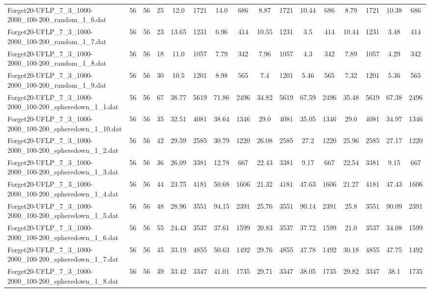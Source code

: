 \begin{sidewaystable}[!ht]
{\begin{tabular}{lccccccccccccccc}
Forget20-UFLP\_7\_3\_1000-2000\_100-200\_random\_1\_6.dat & 56 & 56 & 25 & 12.0 & 1721 & 14.0 & 686 & 8.87 & 1721 & 10.44 & 686 & 8.79 & 1721 & 10.38 & 686 \\
Forget20-UFLP\_7\_3\_1000-2000\_100-200\_random\_1\_7.dat & 56 & 56 & 23 & 13.65 & 1231 & 6.96 & 414 & 10.55 & 1231 & 3.5 & 414 & 10.44 & 1231 & 3.48 & 414 \\
Forget20-UFLP\_7\_3\_1000-2000\_100-200\_random\_1\_8.dat & 56 & 56 & 18 & 11.0 & 1057 & 7.79 & 342 & 7.96 & 1057 & 4.3 & 342 & 7.89 & 1057 & 4.29 & 342 \\
Forget20-UFLP\_7\_3\_1000-2000\_100-200\_random\_1\_9.dat & 56 & 56 & 30 & 10.5 & 1201 & 8.98 & 565 & 7.4 & 1201 & 5.46 & 565 & 7.32 & 1201 &  \textcolor{blue2}{5.36} & 565 \\
Forget20-UFLP\_7\_3\_1000-2000\_100-200\_spheredown\_1\_1.dat & 56 & 56 & 67 & 38.77 & 5619 & 71.86 & 2496 & 34.82 & 5619 & 67.59 & 2496 & 35.48 & 5619 & 67.38 & 2496 \\
Forget20-UFLP\_7\_3\_1000-2000\_100-200\_spheredown\_1\_10.dat & 56 & 56 & 35 & 32.51 & 4081 & 38.64 & 1346 & 29.0 & 4081 & 35.05 & 1346 & 29.0 & 4081 & 34.97 & 1346 \\
Forget20-UFLP\_7\_3\_1000-2000\_100-200\_spheredown\_1\_2.dat & 56 & 56 & 42 & 29.59 & 2585 & 30.79 & 1220 & 26.08 & 2585 & 27.2 & 1220 &  \textcolor{blue2}{25.96} & 2585 & 27.17 & 1220 \\
Forget20-UFLP\_7\_3\_1000-2000\_100-200\_spheredown\_1\_3.dat & 56 & 56 & 36 & 26.09 & 3381 & 12.78 & 667 & 22.43 & 3381 & 9.17 & 667 & 22.54 & 3381 & 9.15 & 667 \\
Forget20-UFLP\_7\_3\_1000-2000\_100-200\_spheredown\_1\_4.dat & 56 & 56 & 44 & 23.75 & 4181 & 50.68 & 1606 & 21.32 & 4181 & 47.63 & 1606 &  \textcolor{blue2}{21.27} & 4181 & 47.43 & 1606 \\
Forget20-UFLP\_7\_3\_1000-2000\_100-200\_spheredown\_1\_5.dat & 56 & 56 & 48 & 28.96 & 3551 & 94.15 & 2391 & 25.76 & 3551 & 90.14 & 2391 & 25.8 & 3551 & 90.09 & 2391 \\
Forget20-UFLP\_7\_3\_1000-2000\_100-200\_spheredown\_1\_6.dat & 56 & 56 & 55 & 24.43 & 3537 & 37.61 & 1599 &  \textcolor{blue2}{20.83} & 3537 & 37.72 & 1599 & 21.0 & 3537 & 34.08 & 1599 \\
Forget20-UFLP\_7\_3\_1000-2000\_100-200\_spheredown\_1\_7.dat & 56 & 56 & 45 & 33.19 & 4855 & 50.63 & 1492 &  \textcolor{blue2}{29.76} & 4855 & 47.78 & 1492 & 30.18 & 4855 & 47.75 & 1492 \\
Forget20-UFLP\_7\_3\_1000-2000\_100-200\_spheredown\_1\_8.dat & 56 & 56 & 39 & 33.42 & 3347 & 41.01 & 1735 &  \textcolor{blue2}{29.71} & 3347 & 38.05 & 1735 & 29.82 & 3347 & 38.1 & 1735 \\

\end{tabular}}
\end{sidewaystable}
